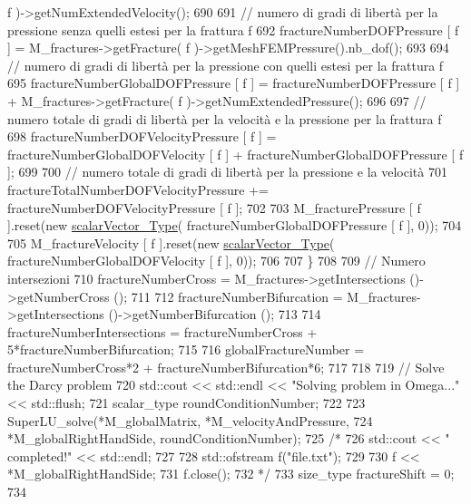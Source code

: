 \begin{DoxyCode}
       f )->getNumExtendedVelocity();
690 
691         \textcolor{comment}{// numero di gradi di libertà per la pressione senza quelli estesi per la frattura f}
692         fractureNumberDOFPressure [ f ] = M\_fractures->getFracture( f )->getMeshFEMPressure().nb\_dof();
693 
694         \textcolor{comment}{// numero di gradi di libertà per la pressione con quelli estesi per la frattura f}
695         fractureNumberGlobalDOFPressure [ f ] = fractureNumberDOFPressure [ f ] + M\_fractures->getFracture(
       f )->getNumExtendedPressure();
696 
697         \textcolor{comment}{// numero totale di gradi di libertà per la velocità e la pressione per la frattura f}
698         fractureNumberDOFVelocityPressure [ f ] = fractureNumberGlobalDOFVelocity [ f ] + 
      fractureNumberGlobalDOFPressure [ f ];
699 
700         \textcolor{comment}{// numero totale di gradi di libertà per la pressione e la velocità}
701         fractureTotalNumberDOFVelocityPressure += fractureNumberDOFVelocityPressure [ f ];
702 
703         M\_fracturePressure [ f ].reset(\textcolor{keyword}{new} \hyperlink{Core_8h_a4e75b5863535ba1dd79942de2846eff0}{scalarVector\_Type}( 
      fractureNumberGlobalDOFPressure [ f ], 0));
704 
705         M\_fractureVelocity [ f ].reset(\textcolor{keyword}{new} \hyperlink{Core_8h_a4e75b5863535ba1dd79942de2846eff0}{scalarVector\_Type}( 
      fractureNumberGlobalDOFVelocity [ f ], 0));
706 
707     \}
708 
709     \textcolor{comment}{// Numero intersezioni}
710     fractureNumberCross = M\_fractures->getIntersections ()->getNumberCross ();
711    
712     fractureNumberBifurcation = M\_fractures->getIntersections ()->getNumberBifurcation ();
713     
714     fractureNumberIntersections = fractureNumberCross + 5*fractureNumberBifurcation;
715     
716     globalFractureNumber = fractureNumberCross*2 + fractureNumberBifurcation*6;
717 
718 
719     \textcolor{comment}{// Solve the Darcy problem}
720     std::cout << std::endl << \textcolor{stringliteral}{"Solving problem in Omega..."} << std::flush;
721     scalar\_type roundConditionNumber;
722 
723     SuperLU\_solve(*M\_globalMatrix, *M\_velocityAndPressure,
724                   *M\_globalRightHandSide, roundConditionNumber);
725 \textcolor{comment}{/*}
726 \textcolor{comment}{    std::cout << " completed!" << std::endl;}
727 \textcolor{comment}{}
728 \textcolor{comment}{    std::ofstream f("file.txt");}
729 \textcolor{comment}{    }
730 \textcolor{comment}{    f << *M\_globalRightHandSide; }
731 \textcolor{comment}{    f.close();}
732 \textcolor{comment}{  */}  
733     size\_type fractureShift = 0;
734     

\end{DoxyCode}
